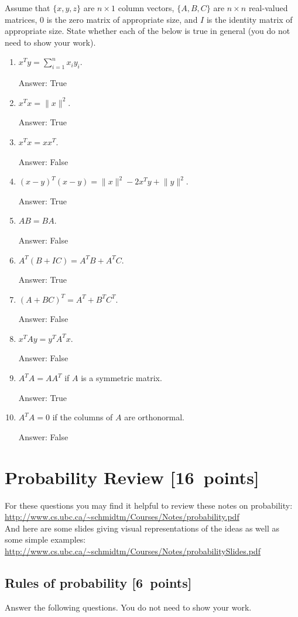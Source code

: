\documentclass{article}
\newcommand{\blu}[1]{{\textcolor{blu}{#1}}}
\newcommand{\gre}[1]{\textcolor{gre}{#1}}
\newcommand\ans[1]{\par\gre{Answer: #1}}
\let\ask\blu
\newcommand\pts[1]{\textcolor{pointscolour}{[#1~points]}}
\newcommand{\norm}[1]{\lVert #1 \rVert}
\begin{document}
  Assume that $\{x,y,z\}$ are $n \times 1$ column vectors, $\{A,B,C\}$ are $n \times n$ real-valued matrices, $0$ is the zero matrix of appropriate size, and $I$ is the identity matrix of appropriate size. \ask{State whether each of the below is true in general} (you do not need to show your work).

  \begin{enumerate}
  \item $x^Ty = \sum_{i=1}^n x_iy_i$.
  \ans{True}
  \item $x^Tx = \norm{x}^2$.
  \ans{True}
  \item $x^Tx = xx^T$.
  \ans{False}
  \item $(x-y)^T(x-y) = \norm{x}^2 - 2x^Ty + \norm{y}^2$.
  \ans{True}
  \item $AB=BA$.
  \ans{False}
  \item $A^T(B + IC) = A^TB + A^TC$.
  \ans{True}
  \item $(A + BC)^T = A^T + B^TC^T$.
  \ans{False}
  \item $x^TAy = y^TA^Tx$.
  \ans{False}
  \item $A^TA = AA^T$ if $A$ is a symmetric matrix.
  \ans{True}
  \item $A^TA = 0$ if the columns of $A$ are orthonormal.
  \ans{False}
  \end{enumerate}


  \clearpage 
  \section{Probability Review \pts{16}}


  For these questions you may find it helpful to review these notes on probability:\\
  \url{http://www.cs.ubc.ca/~schmidtm/Courses/Notes/probability.pdf}\\
  And here are some slides giving visual representations of the ideas as well as some simple examples:\\
  \url{http://www.cs.ubc.ca/~schmidtm/Courses/Notes/probabilitySlides.pdf}

  \subsection{Rules of probability \pts{6}}

  \ask{Answer the following questions.} You do not need to show your work.

\end{document}
